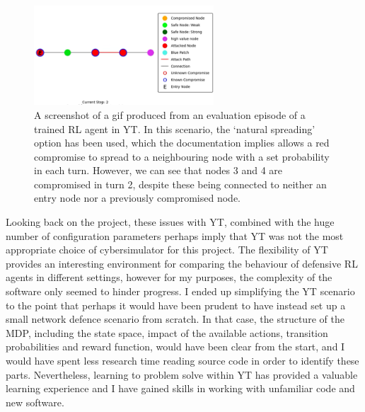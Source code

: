 \documentclass{article}
\begin{document}
\begin{figure}[htp]
    \centering
    \includegraphics[width=0.6\textwidth]{Images/YT_strange.png}
    \caption{A screenshot of a gif produced from an evaluation episode of a trained RL agent in YT. In this scenario, the `natural spreading' option has been used, which the documentation implies allows a red compromise to spread to a neighbouring node with a set probability in each turn. However, we can see that nodes 3 and 4 are compromised in turn 2, despite these being connected to neither an entry node nor a previously compromised node. }
    \label{fig:YT strange}
\end{figure}


Looking back on the project, these issues with YT, combined with the huge number of configuration parameters perhaps imply that YT was not the most appropriate choice of cybersimulator for this project. The flexibility of YT provides an interesting environment for comparing the behaviour of defensive RL agents in different settings, however for my purposes, the complexity of the software only seemed to hinder progress. I ended up simplifying the YT scenario to the point that perhaps it would have been prudent to have instead set up a small network defence scenario from scratch. In that case, the structure of the MDP, including the state space, impact of the available actions, transition probabilities and  reward function, would have been clear from the start, and I would have spent less research time reading source code in order to identify these parts. Nevertheless, learning to problem solve within YT has provided a valuable learning experience and I have gained skills in working with unfamiliar code and new software.  



\end{document}
